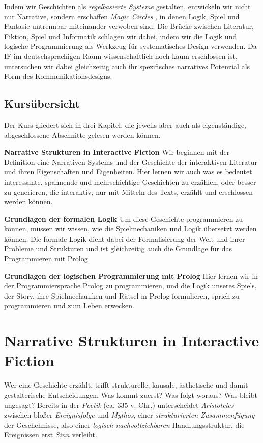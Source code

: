 \documentclass[parskip=half,a4paper,11pt]{scrreprt}
\begin{document}
Indem wir Geschichten als \textit{regelbasierte Systeme} gestalten, entwickeln wir nicht nur Narrative, sondern erschaffen \textit{Magic Circles} \citep{Huizinga1938}, in denen Logik, Spiel und Fantasie untrennbar miteinander verwoben sind. Die Brücke zwischen Literatur, Fiktion, Spiel und Informatik schlagen wir dabei, indem wir die Logik und logische Programmierung als Werkzeug für systematisches Design verwenden. Da IF im deutschsprachigen Raum wissenschaftlich noch kaum erschlossen ist, untersuchen wir dabei gleichzeitig auch ihr spezifisches narratives Potenzial als Form des Kommunikationsdesigns. 

\section{Kursübersicht}

Der Kurs gliedert sich in drei Kapitel, die jeweils aber auch als eigenständige, abgeschlossene Abschnitte gelesen werden können. 

\textbf{Narrative Strukturen in Interactive Fiction}
Wir beginnen mit der Definition eine Narrativen Systems und der Geschichte der interaktiven Literatur und ihren Eigenschaften und Eigenheiten. Hier lernen wir auch was es bedeutet interessante, spannende und mehrschichtige Geschichten zu erzählen, oder besser zu generieren, die interaktiv, nur mit Mitteln des Texts, erzählt und erschlossen werden können.

\textbf{Grundlagen der formalen Logik}
Um diese Geschichte programmieren zu können, müssen wir wissen, wie die Spielmechaniken und Logik übersetzt werden können. Die formale Logik dient dabei der Formalisierung der Welt und ihrer Probleme und Strukturen und ist gleichzeitig auch die Grundlage für das Programmieren mit Prolog.

\textbf{Grundlagen der logischen Programmierung mit Prolog}
Hier lernen wir in der Programmiersprache Prolog zu programmieren, und die Logik unseres Spiels, der Story, ihre Spielmechaniken und Rätsel in Prolog formulieren, sprich zu programmieren und zum Leben erwecken.

\chapter{Narrative Strukturen in Interactive Fiction}

Wer eine Geschichte erzählt, trifft strukturelle, kausale, ästhetische und damit gestalterische Entscheidungen. Was kommt zuerst? Was folgt woraus? Was bleibt ungesagt? Bereits in der \textit{Poetik} (ca. 335 v. Chr.)  unterscheidet \textit{Aristoteles} zwischen bloßer \textit{Ereignisfolge }und \textit{Mythos}, einer \textit{strukturierten Zusammenfügung} der Geschehnisse, also einer \textit{logisch nachvollziehbaren} Handlungsstruktur, die Ereignissen erst \textit{Sinn }verleiht.
\end{document}
